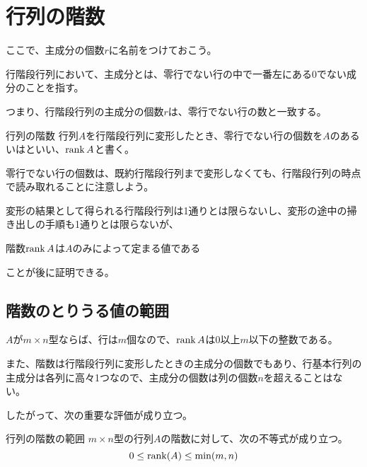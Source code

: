 \documentclass[../../../topic_linear-algebra]{subfiles}
\begin{document}
\sectionline
\section{行列の階数}

ここで、主成分の個数$r$に名前をつけておこう。

\br

行階段行列において、主成分とは、零行でない行の中で一番左にある0でない成分のことを指す。

つまり、行階段行列の主成分の個数$r$は、零行でない行の数と一致する。

\begin{definition}{行列の階数}
  行列$A$を行階段行列に変形したとき、零行でない行の個数を$A$のあるいはといい、$\rank A$と書く。
\end{definition}

零行でない行の個数は、既約行階段行列まで変形しなくても、行階段行列の時点で読み取れることに注意しよう。

\br

変形の結果として得られる行階段行列は1通りとは限らないし、変形の途中の掃き出しの手順も1通りとは限らないが、
\begin{emphabox}
  \begin{spacebox}
    \begin{center}
      階数$\rank A$は$A$のみによって定まる値である
    \end{center}
  \end{spacebox}
\end{emphabox}
ことが後に証明できる。

\subsection{階数のとりうる値の範囲}

$A$が$m \times n$型ならば、行は$m$個なので、$\rank A$は0以上$m$以下の整数である。

\br

また、階数は行階段行列に変形したときの主成分の個数でもあり、行基本行列の主成分は各列に高々1つなので、主成分の個数は列の個数$n$を超えることはない。

\br

したがって、次の重要な評価が成り立つ。

\begin{theorem}{行列の階数の範囲}
  $m \times n$型の行列$A$の階数に対して、次の不等式が成り立つ。
  \begin{equation*}
    0 \leq \rank(A) \leq \min(m,n)
  \end{equation*}
\end{theorem}
\end{document}
